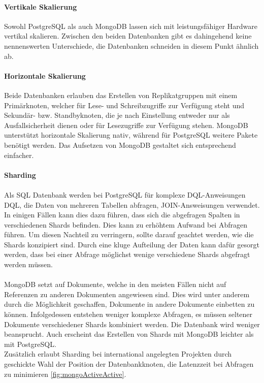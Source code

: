 \paragraph{Vertikale Skalierung\\}
Sowohl PostgreSQL als auch MongoDB lassen sich mit leistungsfähiger Hardware vertikal skalieren.
Zwischen den beiden Datenbanken gibt es dahingehend keine nennenswerten Unterschiede, die Datenbanken schneiden in diesem Punkt ähnlich ab.

\paragraph{Horizontale Skalierung\\}
Beide Datenbanken erlauben das Erstellen von Replikatgruppen mit einem Primärknoten, welcher für Lese- und Schreibzugriffe zur Verfügung steht und Sekundär- bzw. Standbyknoten, die je nach Einstellung entweder nur als Ausfallsicherheit dienen oder für Lesezugriffe zur Verfügung stehen.
MongoDB unterstützt horizontale Skalierung nativ, während für PostgreSQL weitere Pakete benötigt werden. \cite{db:mongoVsPostgres}
Das Aufsetzen von MongoDB gestaltet sich entsprechend einfacher.

\paragraph{Sharding\\}
\paragraph{}
Als SQL Datenbank werden bei PostgreSQL für komplexe DQL-Anweisungen \gls{DQL}, die Daten von mehreren Tabellen abfragen, JOIN-Answeisungen verwendet.
In einigen Fällen kann dies dazu führen, dass sich die abgefragen Spalten in verschiedenen Shards befinden.
Dies kann zu erhöhtem Aufwand bei Abfragen führen.
Um diesen Nachteil zu verringern, sollte darauf geachtet werden, wie die Shards konzipiert sind.
Durch eine kluge Aufteilung der Daten kann dafür gesorgt werden, dass bei einer Abfrage möglichst wenige verschiedene Shards abgefragt werden müssen.

\paragraph{}
MongoDB setzt auf Dokumente, welche in den meisten Fällen nicht auf Referenzen zu anderen Dokumenten angewiesen sind.
Dies wird unter anderem durch die Möglichkeit geschaffen, Dokumente in andere Dokumente einbetten zu können.
Infolgedessen entstehen weniger komplexe Abfragen, es müssen seltener Dokumente verschiedener Shards kombiniert werden.
Die Datenbank wird weniger beansprucht.
Auch erscheint das Erstellen von Shards mit MongoDB leichter als mit PostgreSQL.\\
Zusätzlich erlaubt Sharding bei international angelegten Projekten durch geschickte Wahl der Position der Datenbankknoten, die Latenzzeit bei Abfragen zu minimieren \autoref{fig:mongoActiveActive}.

